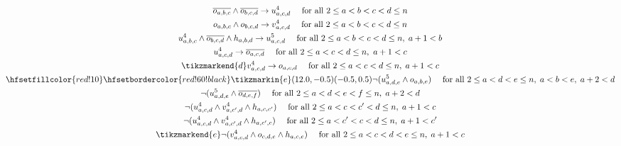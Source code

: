 \begin{figure}
\begin{spreadlines}{16pt}
\begin{gather}
  \ov{\orvar_{a,b,c}} \land \ov{\orvar_{b,c,d}} \rightarrow \uvar_{a, c, d} \quad \text{ for all } 2 \leq a < b < c < d \leq n\label{eq:capDef}\\
  \orvar_{a, b, c} \land \orvar_{b, c, d} \rightarrow \vvar_{a, c, d} \quad \text{ for all } 2 \leq a < b < c < d \leq n \label{eq:cupDef}\\
  \uvar_{a,b,c} \land \ov{\orvar_{b,c,d}} \land \hvar_{a,b,d} \rightarrow \ufvar_{a, c, d} \quad \text{ for all } 2 \leq a < b < c < d \leq n,\; a+1<b\label{eq:capFDef}\\
  \uvar_{a, c, d} \rightarrow \ov{\orvar_{a,c,d}} \quad \text{ for all } 2 \leq a < c < d \leq n,\ a+1<c\label{eq:capDef2}\\
  \tikzmarkend{d}\vvar_{a, c, d} \rightarrow \orvar_{a,c,d} \quad \text{ for all } 2 \leq a < c < d \leq n,\; a+1<c\label{eq:cupDef2}\\
%
\hfsetfillcolor{red!10}
\hfsetbordercolor{red!60!black}
\tikzmarkin{e}(12.0,-0.5)(-0.5,0.5)
  \neg(\ufvar_{a,d,e} \land \orvar_{a, b, e}) \quad \text { for all } 2 \leq a < d < e \leq n, \; a < b < e, \; a+2 < d\label{eq:no6Hole1Below}\\
  \neg(\ufvar_{a,d,e} \land \ov{\orvar_{d, e, f}}) \quad \text { for all } 2 \leq a < d < e < f\leq n, \; a+2 < d\label{eq:no6Hole4Above}\\
  \neg(\uvar_{a,c,d} \land \vvar_{a, c', d} \land \hvar_{a,c,c'}) \quad \text{ for all } 2 \leq a < c < c' < d \leq n, \; a+1 < c\label{eq:no6Hole2Below1}\\
  \neg(\uvar_{a,c,d} \land \vvar_{a, c', d} \land \hvar_{a,c',c}) \quad \text{ for all } 2 \leq a < c' < c < d \leq n, \; a+1 < c'\label{eq:no6Hole2Below2}\\
  \tikzmarkend{e}\neg(\vvar_{a,c,d} \land \orvar_{c, d, e} \land \hvar_{a,c,e}) \quad \text{ for all } 2 \leq a < c < d < e \leq n, \; a+1 < c\label{eq:no6Hole3Below}
  \end{gather}
\end{spreadlines}
\end{figure}

